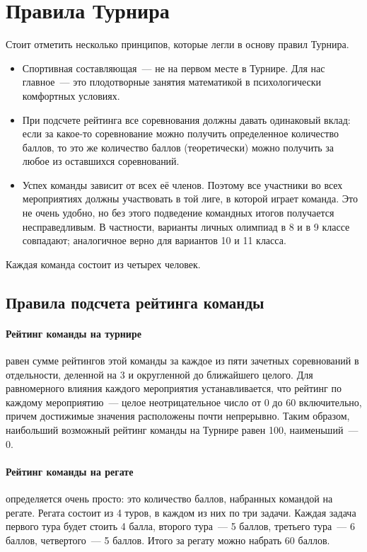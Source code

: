 \section*{Правила Турнира}


Стоит отметить несколько принципов, которые легли в основу правил Турнира.

\begin{itemize}
\item
Спортивная составляющая~--- не на первом месте в Турнире.
Для нас главное~--- это плодотворные занятия математикой в психологически
комфортных условиях.
\item
При подсчете рейтинга все соревнования должны давать одинаковый вклад: если за
какое-то соревнование можно получить определенное количество баллов, то это же
количество баллов (теоретически) можно получить за любое из оставшихся
соревнований.
\item
Успех команды зависит от всех её членов.
Поэтому все участники во всех мероприятиях должны участвовать в той лиге, в
которой играет команда.
Это не очень удобно, но без этого подведение командных итогов получается
несправедливым.
В частности, варианты личных олимпиад в 8 и в 9 классе совпадают; аналогичное
верно для вариантов 10 и 11 класса.
\end{itemize}

Каждая команда состоит из четырех человек.

\subsection*{Правила подсчета рейтинга команды}

\paragraph{Рейтинг команды на турнире}
равен сумме рейтингов этой команды за каждое из пяти зачетных соревнований в
отдельности, деленной на 3 и округленной до ближайшего целого.
Для равномерного влияния каждого мероприятия устанавливается, что рейтинг по
каждому мероприятию~--- целое неотрицательное число от 0 до 60 включительно,
причем достижимые значения расположены почти непрерывно.
Таким образом, наибольший возможный рейтинг команды на Турнире равен 100,
наименьший~--- 0.
\paragraph{Рейтинг команды на регате}
определяется очень просто: это количество баллов, набранных командой на регате.
Регата состоит из 4 туров, в каждом из них по три задачи.
Каждая задача первого тура будет стоить 4 балла, второго тура~--- 5 баллов,
третьего тура~--- 6 баллов, четвертого~--- 5 баллов.
Итого за регату можно набрать 60 баллов.

